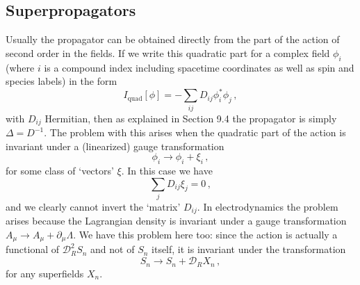 
\providecommand{\SuperD}{\mathcal{D}}

\subsection{Superpropagators}

Usually the propagator can be obtained directly from the part of the action
of second order in the fields. If we write this quadratic part for a complex
field \(\phi_i\) (where \(i\) is a compound index including spacetime
coordinates as well as spin and species labels) in the form
\begin{equation}
  I_{\mathrm{quad}}[\phi]
  =-\sum_{ij}D_{ij}\phi_i^*\phi_j\,,
  \tag{30.2.1}\label{eq:30.2.1}
\end{equation}
with \(D_{ij}\) Hermitian, then as explained in Section 9.4 the propagator is
simply \(\Delta=D^{-1}\). The problem with this arises when the quadratic
part of the action is invariant under a (linearized) gauge transformation
\begin{equation}
  \phi_i\longrightarrow\phi_i+\xi_i\,,
  \tag{30.2.2}\label{eq:30.2.2}
\end{equation}
for some class of `vectors' \(\xi\). In this case we have
\begin{equation}
  \sum_jD_{ij}\xi_j=0\,,
  \tag{30.2.3}\label{eq:30.2.3}
\end{equation}
and we clearly cannot invert the `matrix' \(D_{ij}\). In electrodynamics the
problem arises because the Lagrangian density is invariant under a gauge
transformation \(A_\mu\longrightarrow A_\mu+\partial_\mu\Lambda\). We have
this problem here too: since the action is actually a functional of
\(\SuperD_R^2S_n\) and not of \(S_n\) itself, it is invariant under the
transformation
\begin{equation}
  S_n\longrightarrow S_n+\SuperD_RX_n\,,
  \tag{30.2.4}\label{eq:30.2.4}
\end{equation}
for any superfields \(X_n\).

